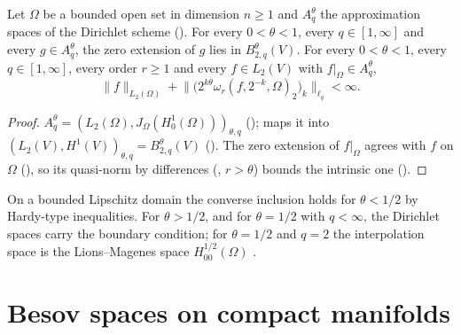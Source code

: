 \begin{proposition}
\label{prop:spectral-besov-dirichlet-inclusion}
\leanok
{}
Let $\Omega$ be a bounded open set in dimension $n \geq 1$ and $A^\theta_q$ the approximation
spaces of the Dirichlet scheme (). For every $0 < \theta < 1$,
every $q \in [1, \infty]$ and every $g \in A^\theta_q$, the zero extension of $g$ lies in
$B^\theta_{2,q}(V)$. For every $0 < \theta < 1$, every $q \in [1, \infty]$, every order
$r \geq 1$ and every $f \in L_2(V)$ with $f|_\Omega \in A^\theta_q$,
\[
  \|f\|_{L_2(\Omega)} + \bigl\| \bigl(2^{k\theta} \omega_r(f, 2^{-k}, \Omega)_2\bigr)_k
    \bigr\|_{\ell_q} < \infty .
\]
\end{proposition}

\begin{proof}
\leanok
$A^\theta_q = (L_2(\Omega), J_\Omega(H^1_0(\Omega)))_{\theta, q}$
();  maps it into
$(L_2(V), H^1(V))_{\theta, q} = B^\theta_{2,q}(V)$ (). The
zero extension of $f|_\Omega$ agrees with $f$ on $\Omega$ (), so its
quasi-norm by differences (, $r > \theta$) bounds the intrinsic one
().
\end{proof}

On a bounded Lipschitz domain the converse inclusion holds for $\theta < 1/2$ by Hardy-type
inequalities. For $\theta > 1/2$, and for $\theta = 1/2$ with $q < \infty$, the Dirichlet spaces
carry the boundary condition; for $\theta = 1/2$ and $q = 2$ the interpolation space is the
Lions--Magenes space $H^{1/2}_{00}(\Omega)$ \cite[Chapter~1, Theorem~11.7]{LionsMagenes1972}.

\chapter{Besov spaces on compact manifolds}
\label{ch:manifolds}

